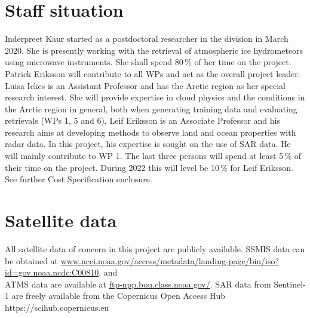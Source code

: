 \documentclass[12pt,oneside,a4paper]{article}
\begin{document}
\section{Staff situation}
%
\label{sec:staff}
Inderpreet Kaur started as a postdoctoral researcher in the division in March
2020. She is presently working with the retrieval of atmospheric ice hydrometeors
using microwave instruments. She shall spend 80\,\% of her time on the
project. Patrick Eriksson will contribute to all WPs and act as the overall project
leader. Luisa Ickes is an Assistant Professor and has the Arctic region as her
special research interest. She will provide expertise in cloud physics and the
conditions in the Arctic region in general, both when generating training data
and evaluating retrievals (WPs 1, 5 and 6). Leif Eriksson is an Associate
Professor and his research aims at developing methods to observe land and ocean
properties with radar data. In this project, his expertise is sought on the use
of SAR data. He will mainly contribute to WP 1. The
last three persons will spend at least 5\,\% of their time on the project.
During 2022 this will level be 10\,\% for Leif Eriksson. See further Cost
Specification enclosure.


\section{Satellite data}
%
All satellite data of concern in this project are publicly available. SSMIS
data can be obtained at
\url{www.ncei.noaa.gov/access/metadata/landing-page/bin/iso?id=gov.noaa.ncdc:C00810},
and\\ATMS data are available at \url{ftp-npp.bou.class.noaa.gov/}. SAR data from Sentinel-1 are freely  available from the Copernicus Open Access Hub https://scihub.copernicus.eu

{\footnotesize
	
}
\end{document}
